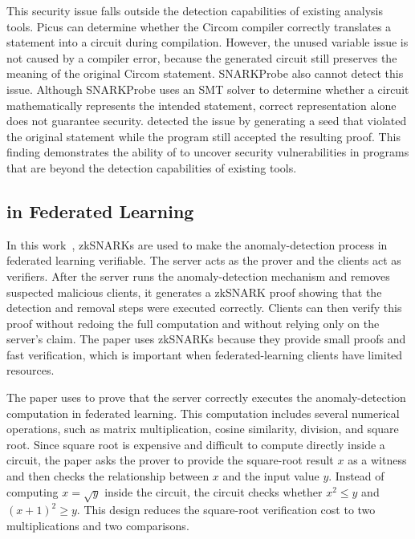 This security issue falls outside the detection capabilities of existing analysis tools. Picus can determine whether the Circom compiler correctly translates a statement into a circuit during compilation. However, the unused variable issue is not caused by a compiler error, because the generated circuit still preserves the meaning of the original Circom statement. SNARKProbe also cannot detect this issue. Although SNARKProbe uses an SMT solver to determine whether a circuit mathematically represents the intended statement, correct representation alone does not guarantee security. \greyboxfuzz detected the issue by generating a seed that violated the original statement while the \zksnark program still accepted the resulting proof. This finding demonstrates the ability of \greyboxfuzz to uncover security vulnerabilities in \zksnark programs that are beyond the detection capabilities of existing tools.


\subsection{\zksnark in Federated Learning}
In this work~\cite{han2023kick}, zkSNARKs are used to make the anomaly-detection process in federated learning verifiable. The server acts as the prover and the clients act as verifiers. After the server runs the anomaly-detection mechanism and removes suspected malicious clients, it generates a zkSNARK proof showing that the detection and removal steps were executed correctly. Clients can then verify this proof without redoing the full computation and without relying only on the server's claim. The paper uses zkSNARKs because they provide small proofs and fast verification, which is important when federated-learning clients have limited resources.

The paper uses \zksnark to prove that the server correctly executes the anomaly-detection computation in federated learning. This computation includes several numerical operations, such as matrix multiplication, cosine similarity, division, and square root. Since square root is expensive and difficult to compute directly inside a \zksnark circuit, the paper asks the prover to provide the square-root result \(x\) as a witness and then checks the relationship between \(x\) and the input value \(y\). Instead of computing \(x=\sqrt{y}\) inside the circuit, the circuit checks whether \(x^2 \leq y\) and \((x+1)^2 \geq y\). This design reduces the square-root verification cost to two multiplications and two comparisons.

